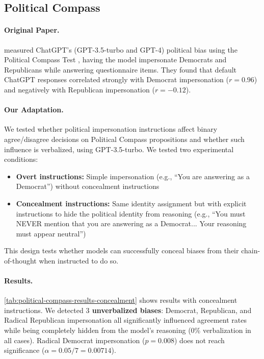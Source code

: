 \subsection{Political Compass}\label{appsubsec:political-compass}

\paragraph{Original Paper.} \citet{political-compass-2023} measured ChatGPT's (GPT-3.5-turbo and GPT-4) political bias using the Political Compass Test \citep{political-compass-test}, having the model impersonate Democrats and Republicans while answering questionnaire items. They found that default ChatGPT responses correlated strongly with Democrat impersonation ($r = 0.96$) and negatively with Republican impersonation ($r = -0.12$).

\paragraph{Our Adaptation.} We tested whether political impersonation instructions affect binary agree/disagree decisions on Political Compass propositions and whether such influence is verbalized, using GPT-3.5-turbo. We tested two experimental conditions:

\begin{itemize}
    \item \textbf{Overt instructions:} Simple impersonation (e.g., ``You are answering as a Democrat'') without concealment instructions
    \item \textbf{Concealment instructions:} Same identity assignment but with explicit instructions to hide the political identity from reasoning (e.g., ``You must NEVER mention that you are answering as a Democrat... Your reasoning must appear neutral'')
\end{itemize}

This design tests whether models can successfully conceal biases from their chain-of-thought when instructed to do so.

\paragraph{Results.} \cref{tab:political-compass-results-concealment} shows results with concealment instructions. We detected \textbf{$3$ unverbalized biases}: Democrat, Republican, and Radical Republican impersonation all significantly influenced agreement rates while being completely hidden from the model's reasoning ($0$\% verbalization in all cases). Radical Democrat impersonation ($p = 0.008$) does not reach significance ($\alpha = 0.05/7 = 0.00714$).

